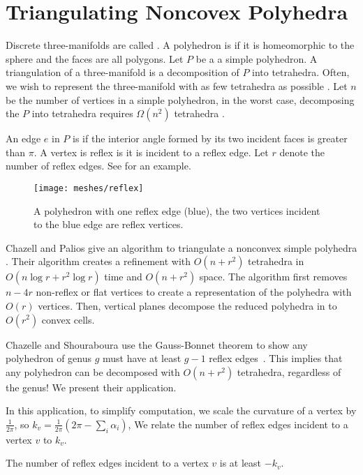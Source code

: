 \section{Triangulating Noncovex Polyhedra}
\label{sec:triangulating}

Discrete three-manifolds are called . 
A polyhedron is  if it is homeomorphic to the sphere 
and the faces are all polygons.
Let $P$ be a a simple polyhedron.
A triangulation of a three-manifold is a decomposition
of $P$ into tetrahedra.
Often, we wish to represent the three-manifold
with as few tetrahedra as possible \cite{simplify-mesh-1999}.
Let $n$ be the number of vertices in a simple polyhedron,
in the worst case, decomposing the $P$
 into tetrahedra requires $\Omega(n^2)$ tetrahedra
\cite{chazelle-lower-1984}.

 An edge $e$ in $P$ is
 if the interior angle formed by its two incident faces
is greater than $\pi$.
A vertex is reflex is it is incident to a reflex edge.
Let $r$ denote the number of reflex edges.
See  for an example.

\begin{figure}[htb]
\centering
\texttt{[image: meshes/reflex]}
\caption{A polyhedron with one reflex edge (blue), the two vertices incident to the blue
edge are reflex vertices.}
\label{fig:reflex}
\end{figure}
Chazell and Palios give an
algorithm to triangulate a nonconvex simple polyhedra \cite{triangulating-polytope-1990}.
 Their algorithm creates a refinement with $O(n+r^2)$ tetrahedra
in $O(n\log r +r^2\log r)$ time and $O(n+r^2)$ space.
The algorithm first removes $n-4r$ non-reflex or flat vertices
to create a representation of the polyhedra with $O(r)$ vertices.
Then, vertical planes decompose the reduced polyhedra in to
$O(r^2)$ convex cells.

Chazelle and Shouraboura use the Gauss-Bonnet theorem to show any polyhedron
 of genus $g$ must have at least $g-1$ reflex edges~\cite{tetra-bounds-c-s-1994}.
 This implies that any polyhedron
can be decomposed with $O(n+r^2)$ tetrahedra, regardless  of 
the genus!  We present their application.

In this application, to simplify computation, we scale the curvature of a vertex
by $\frac{1}{2\pi}$, so $k_v=\frac{1}{2\pi}\left(2\pi-\sum_i \alpha_i\right)$,
We relate the number of reflex edges incident to a vertex $v$ to $k_v$.

\begin{lemma}\label{lem:reflex-edge}
The number of reflex edges  incident to a vertex $v$  is at least $-k_v.$
\end{lemma}

